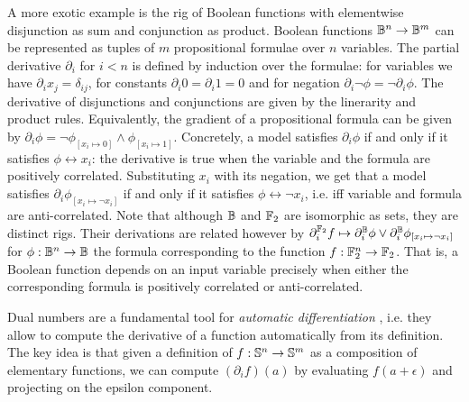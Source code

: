 A more exotic example is the rig of Boolean functions with elementwise
disjunction as sum and conjunction as product. Boolean functions $\B^n \to \B^m$
can be represented as tuples of $m$ propositional formulae over $n$ variables.
The partial derivative $\partial_i$ for $i < n$ is defined by induction over
the formulae: for variables we have $\partial_i x_j = \delta_{ij}$,
for constants $\partial_i 0 = \partial_i 1 = 0$ and for negation
$\partial_i \neg \phi = \neg \partial_i \phi$. The derivative of disjunctions
and conjunctions are given by the linerarity and product rules.
Equivalently, the gradient of a propositional formula can be given by
$\partial_i \phi = \neg \phi_{[x_i \mapsto 0]} \land \phi_{[x_i \mapsto 1]}$.
Concretely, a model satisfies $\partial_i \phi$ if and only if it satisfies
$\phi \leftrightarrow x_i$: the derivative is true when the variable and the
formula are positively correlated. Substituting $x_i$ with its negation,
we get that a model satisfies $\partial_i \phi_{[x_i \mapsto \neg x_i]}$
if and only if it satisfies $\phi \leftrightarrow \neg x_i$, i.e. iff variable
and formula are anti-correlated.
Note that although $\B$ and $\F_2$ are isomorphic as sets, they are distinct
rigs. Their derivations are related however by $\partial^{\F_2}_i f \mapsto
\partial^\B_i \phi \lor \partial^\B_i \phi_{[x_i \mapsto \neg x_i]}$
for $\phi : \B^n \to \B$ the formula corresponding to the function
$f : \F_2^n \to \F_2$. That is, a Boolean function depends on an input variable
precisely when either the corresponding formula is positively correlated or
anti-correlated.

Dual numbers are a fundamental tool for \emph{automatic differentiation}
\cite{Hoffmann16}, i.e.
they allow to compute the derivative of a function automatically from its
definition. The key idea is that given a definition of $f : \S^n \to \S^m$ as a
composition of elementary functions, we can compute $(\partial_i f)(a)$ by
evaluating $f(a + \epsilon)$ and projecting on the epsilon component.
